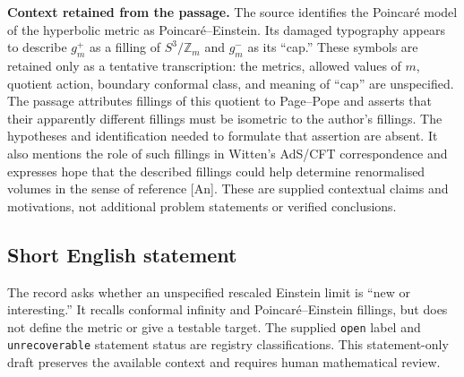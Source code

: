 \documentclass[11pt]{article}
\newcommand{\Z}{\mathbb{Z}}
\begin{document}
\textbf{Context retained from the passage.} The source identifies the Poincar\'e model of the hyperbolic metric as Poincar\'e--Einstein. Its damaged typography appears to describe \(g_m^+\) as a filling of \(S^3/\Z_m\) and \(g_m^-\) as its ``cap.'' These symbols are retained only as a tentative transcription: the metrics, allowed values of \(m\), quotient action, boundary conformal class, and meaning of ``cap'' are unspecified. The passage attributes fillings of this quotient to Page--Pope and asserts that their apparently different fillings must be isometric to the author's fillings. The hypotheses and identification needed to formulate that assertion are absent. It also mentions the role of such fillings in Witten's AdS/CFT correspondence and expresses hope that the described fillings could help determine renormalised volumes in the sense of reference [An]. These are supplied contextual claims and motivations, not additional problem statements or verified conclusions.
\subsection{Short English statement}
The record asks whether an unspecified rescaled Einstein limit is ``new or interesting.'' It recalls conformal infinity and Poincar\'e--Einstein fillings, but does not define the metric or give a testable target. The supplied \texttt{open} label and \texttt{unrecoverable} statement status are registry classifications. This statement-only draft preserves the available context and requires human mathematical review.
\end{document}
